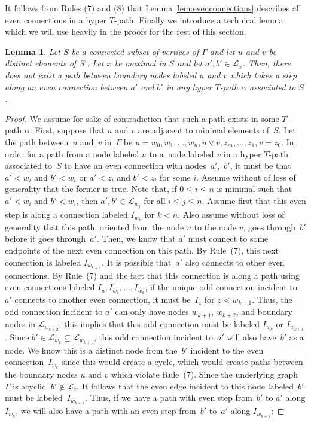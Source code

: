 \documentclass[pdftex]{sigma}
\numberwithin{equation}{section}
\newtheorem{Lemma}[Theorem]{Lemma}
\begin{document}
It follows from Rules (7) and (8) that Lemma \ref{lem:evenconnections} describes all even connections in a hyper $T$-path.
Finally we introduce a technical lemma which we will use heavily in the proofs for the rest of this section.
\begin{Lemma}\label{lem:NoExtendedVertexEvenStep}
Let $S$ be a connected subset of vertices of $\Gamma$ and let $u$ and $v$ be distinct elements of $S'$. Let $x$ be maximal in $S$ and let $a', b' \in \mathcal{L}_x$. Then, there does not exist a path between boundary nodes labeled $u$ and $v$ which takes a step along an even connection between $a'$ and $b'$ in any hyper $T$-path $\alpha$ associated to $S$.
\end{Lemma}
\begin{proof}
We assume for sake of contradiction that such a path exists in some $T$-path $\alpha$. First, suppose that $u$ and $v$ are adjacent to minimal elements of~$S$. Let the path between~$u$ and~$v$ in~$\Gamma$ be $u = w_0, w_1,\ldots,w_n,u \vee v, z_m,\ldots,z_1,v = z_0$. In order for a path from a node labeled $u$ to a~node labeled $v$ in a hyper $T$-path associated to~$S$ to have an even connection with nodes~$a'$,~$b'$, it must be that $a' < w_i$ and $b' < w_i$ or $a' < z_i$ and $b' < z_i$ for some $i$. Assume without of loss of generality that the former is true. Note that, if $0 \leq i \leq n$ is minimal such that $a' < w_i$ and $b' < w_i$, then $a',b' \in \mathcal{L}_{w_j}$ for all $i \leq j \leq n$.
Assume first that this even step is along a connection labeled $I_{w_k}$ for $k < n$. Also assume without loss of generality that this path, oriented from the node $u$ to the node $v$, goes through~$b'$ before it goes through~$a'$. Then, we know that $a'$ must connect to some endpoints of the next even connection on this path. By Rule~(7), this next connection is labeled $I_{w_{k+1}}$. It is possible that~$a'$ also connects to other even connections. By Rule~(7) and the fact that this connection is along a path using even connections labeled $I_u, I_{w_1},\ldots,I_{w_k}$, if the unique odd connection incident to~$a'$ connects to another even connection, it must be~$I_z$ for $z \lessdot w_{k+1}$. Thus, the odd connection incident to $a'$ can only have nodes $w_{k+1}$, $w_{k+2}$, and boundary nodes in $\mathcal{L}_{w_{k+2}}$; this implies that this odd connection must be labeled $I_{w_k}$ or $I_{w_{k+1}}$. Since $b' \in \mathcal{L}_{w_k} \subseteq \mathcal{L}_{w_{k+1}}$, this odd connection incident to~$a'$ will also have~$b'$ as a node. We know this is a distinct node from the~$b'$ incident to the even connection~$I_{w_k}$ since this would create a cycle, which would create paths between the boundary nodes $u$ and $v$ which violate Rule~(7). Since the underlying graph~$\Gamma$ is acyclic, $b' \notin \mathcal{L}_{z}$. It follows that the even edge incident to this node labeled~$b'$ must be labeled~$I_{w_{k+1}}$. Thus, if we have a path with even step from~$b'$ to $a'$ along $I_{w_k}$, we will also have a path with an even step from~$b'$ to~$a'$ along $I_{w_{k+1}}$:

\end{proof}
\end{document}
